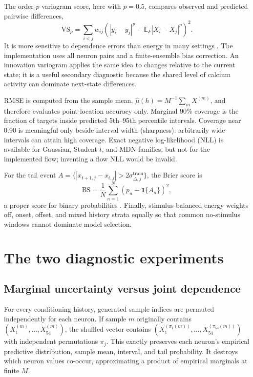 \documentclass[11pt]{article}
\newcommand{\E}{\mathbb{E}}
\begin{document}
The order-$p$ variogram score, here with $p=0.5$, compares observed and predicted pairwise differences,
\begin{equation}
 \mathrm{VS}_{p}
 =\sum_{i<j}w_{ij}
 \left(
 |y_i-y_j|^p-\E_F|X_i-X_j|^p
 \right)^2.
 \label{eq:variogram}
\end{equation}
It is more sensitive to dependence errors than energy in many settings \citep{scheuerer2015variogram}. The implementation uses all neuron pairs and a finite-ensemble bias correction. An innovation variogram applies the same idea to changes relative to the current state; it is a useful secondary diagnostic because the shared level of calcium activity can dominate next-state differences.

RMSE is computed from the sample mean, $\hat\mu(h)=M^{-1}\sum_m X^{(m)}$, and therefore evaluates point-location accuracy only. Marginal 90\% coverage is the fraction of targets inside predicted 5th--95th percentile intervals. Coverage near 0.90 is meaningful only beside interval width (sharpness): arbitrarily wide intervals can attain high coverage. Exact negative log-likelihood (NLL) is available for Gaussian, Student-$t$, and MDN families, but not for the implemented flow; inventing a flow NLL would be invalid.

For the tail event $A=\{|x_{t+1,j}-x_{t,j}|>2\sigma^{\mathrm{train}}_{\Delta,j}\}$, the Brier score is
\begin{equation}
 \mathrm{BS}=\frac{1}{N}\sum_{n=1}^{N}(p_n-\mathbf 1\{A_n\})^2,
\end{equation}
a proper score for binary probabilities \citep{brier1950verification}. Finally, stimulus-balanced energy weights off, onset, offset, and mixed history strata equally so that common no-stimulus windows cannot dominate model selection.

\section{The two diagnostic experiments}

\subsection{Marginal uncertainty versus joint dependence}

For every conditioning history, generated sample indices are permuted independently for each neuron. If sample $m$ originally contains $(X^{(m)}_1,\ldots,X^{(m)}_{54})$, the shuffled vector contains $(X^{(\pi_1(m))}_1,\ldots,X^{(\pi_{54}(m))}_{54})$ with independent permutations $\pi_j$. This exactly preserves each neuron's empirical predictive distribution, sample mean, interval, and tail probability. It destroys which neuron values co-occur, approximating a product of empirical marginals at finite $M$.
\end{document}

